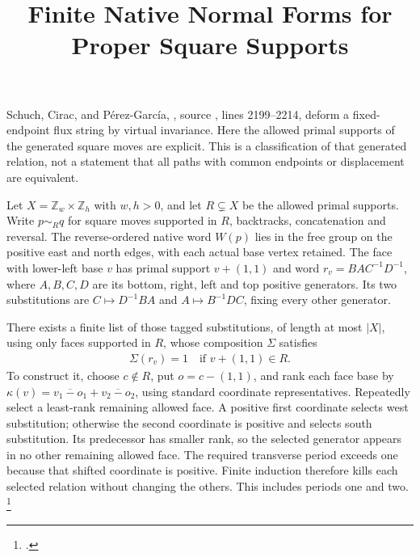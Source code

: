 \documentclass{article}
\title{Finite Native Normal Forms for Proper Square Supports}
\author{}
\date{}
\begin{document}
\maketitle
{}

Schuch, Cirac, and P\'erez-Garc\'ia, \cite[Lemma~6.14]{Schuch2010PEPS},
source , lines 2199--2214,
deform a fixed-endpoint flux string by virtual invariance.
Here the allowed primal supports of the generated square moves are explicit.
This is a classification of that generated relation, not a statement that
all paths with common endpoints or displacement are equivalent.

Let $X=\mathbb Z_w\times\mathbb Z_h$ with $w,h>0$, and let $R\subsetneq X$
be the allowed primal supports. Write $p\sim_Rq$ for square moves supported
in $R$, backtracks, concatenation and reversal. The reverse-ordered native
word $W(p)$ lies in the free group on the positive east and north edges,
with each actual base vertex retained. The face with lower-left base $v$
has primal support $v+(1,1)$ and word $r_v=BAC^{-1}D^{-1}$, where $A,B,C,D$
are its bottom, right, left and top positive generators.
Its two substitutions are $C\mapsto D^{-1}BA$ and $A\mapsto B^{-1}DC$,
fixing every other generator.

There exists a finite list of those tagged substitutions, of length at most
$|X|$, using only faces supported in $R$, whose composition $\Sigma$ satisfies
\begin{align}
    \Sigma(r_v)=1\quad\text{if }v+(1,1)\in R.
    \label{eq:scp10_proper_support_face_elimination}
\end{align}
To construct it, choose $c\notin R$, put $o=c-(1,1)$, and rank each face base by
$\kappa(v)=\overline{v_1-o_1}+\overline{v_2-o_2}$, using standard coordinate
representatives. Repeatedly select a least-rank remaining allowed face.
A positive first coordinate selects west substitution; otherwise the second
coordinate is positive and selects south substitution. Its predecessor has
smaller rank, so the selected generator appears in no other remaining allowed
face. The required transverse period exceeds one because that shifted
coordinate is positive. Finite induction therefore kills each selected
relation without changing the others. This includes periods one and two.
\footnote{.}
\end{document}
